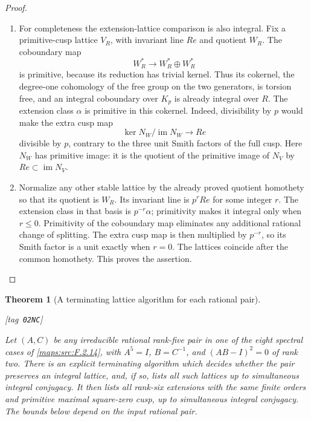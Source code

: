 \documentclass[11pt,a4paper]{article}
\numberwithin{equation}{section}
\newtheorem{theorem}{Theorem}[section]
\theoremstyle{definition}
\newcommand{\StatementRecord}[4]{{\upshape\footnotesize[tag~\texttt{#3}]}\enspace\ignorespaces}
\begin{document}
\begin{proof}
\begin{enumerate}[label=\arabic*.]
\item For completeness the extension-lattice comparison is also
integral.  Fix a primitive-cusp lattice $V_R$, with invariant
line $Re$ and quotient $W_R$.
The coboundary map
\[
 W_R^*\longrightarrow W_R^*\oplus W_R^*
\]
is primitive, because its reduction has trivial kernel.
Thus its cokernel, the degree-one cohomology of the free
group on the two generators, is torsion free, and an
integral coboundary over $K_p$ is already integral over $R$.
The extension class $\alpha$ is primitive in this cokernel.
Indeed, divisibility by $p$ would make the extra cusp map
\[
 \ker N_W/\operatorname{im}N_W\longrightarrow Re
\]
divisible by $p$, contrary to the three unit Smith factors
of the full cusp.  Here $N_W$ has primitive image:
it is the quotient of the primitive image of $N_V$ by
$Re\subset\operatorname{im}N_V$.

\item Normalize any other stable lattice by the already proved
quotient homothety so that its quotient is $W_R$.
Its invariant line is $p^rRe$ for some integer $r$.
The extension class in that basis is $p^{-r}\alpha$;
primitivity makes it integral only when $r\leq0$.
Primitivity of the coboundary map eliminates any additional
rational change of splitting.  The extra cusp map is then
multiplied by $p^{-r}$, so its Smith factor is a unit exactly
when $r=0$.  The lattices coincide after the common homothety.
This proves the assertion.

\end{enumerate}
\end{proof}




\begin{theorem}[A terminating lattice algorithm for each rational pair]\hypertarget{tag-02NC}{}\label{maps:src:F.2.22}
\StatementRecord{maps:src:F.2.22}{proved}{02NC}{\cref{maps:src:F.2.14}, \eqref{maps:eq:F.L3}, \eqref{maps:eq:F.L5}, \cref{maps:src:F.2.11}, \eqref{maps:eq:F.L6}, \eqref{maps:eq:F.L7}}


Let $(A,C)$ be any irreducible rational rank-five pair in
one of the eight spectral cases of \ref{maps:src:F.2.14}, with
$A^5=I$, $B=C^{-1}$, and $(AB-I)^2=0$ of rank two.
There is an explicit terminating algorithm which decides
whether the pair preserves an integral lattice, and, if so,
lists all such lattices up to simultaneous integral conjugacy.
It then lists all rank-six extensions with the same finite
orders and primitive maximal square-zero cusp, up to
simultaneous integral conjugacy.  The bounds below depend on the input rational pair.

\end{theorem}
\end{document}
